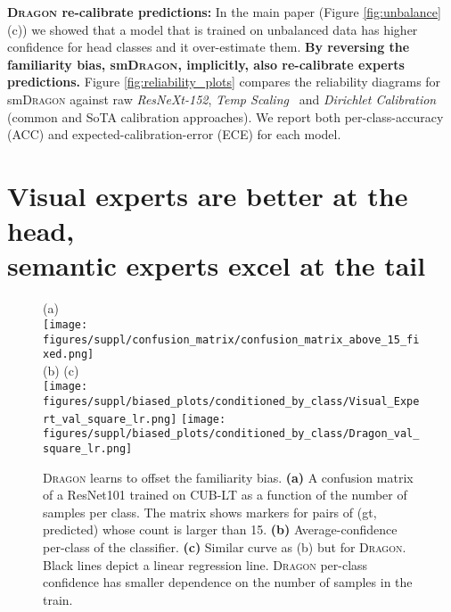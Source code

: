 \documentclass[10pt,twocolumn,letterpaper]{article}
\newcommand{\DRAGON}{\textsc{Dragon}}
\begin{document}
\textbf{\DRAGON{} re-calibrate predictions:}
In the main paper (Figure \ref{fig:unbalance}(c)) we showed that a model that is trained on unbalanced data has higher confidence for head classes and it over-estimate them. \textbf{By reversing the familiarity bias, sm\DRAGON{}, implicitly, also re-calibrate experts predictions.} Figure \ref{fig:reliability_plots} compares the reliability diagrams for sm\DRAGON{} against raw \textit{ResNeXt-152}, \textit{Temp Scaling~\cite{Guo2017OnCO}} and  \textit{Dirichlet Calibration~\cite{Kull2019BeyondTS}} (common and SoTA calibration approaches).
We report both per-class-accuracy (ACC) and expected-calibration-error (ECE) for each model.







\section{Visual experts are better at the head, 
\\
semantic experts excel at the tail}
\label{appendix:visual_vs_attribute}

\begin{figure}[t!]
    \centering
    (a) 
    \\
    \texttt{[image: figures/suppl/confusion\_matrix/confusion\_matrix\_above\_15\_fixed.png]} 
    \\
    (b) \hspace{80pt}
    (c)
    \\
    \texttt{[image: figures/suppl/biased\_plots/conditioned\_by\_class/Visual\_Expert\_val\_square\_lr.png]}
    \texttt{[image: figures/suppl/biased\_plots/conditioned\_by\_class/Dragon\_val\_square\_lr.png]}\\

    \caption{\DRAGON{} learns to offset the familiarity bias. 
    \textbf{(a)} A confusion matrix of a ResNet101 trained  
    on CUB-LT as a function of the number of samples per class. The matrix shows markers for pairs of (gt, predicted) whose count is larger than 15.
    \textbf{(b)} Average-confidence per-class of the classifier.  \textbf{(c)} Similar curve as (b) but for \DRAGON{}. 
    Black lines depict a linear regression line. \DRAGON{} per-class confidence has smaller dependence on the number of samples in the train. 
    }
    \label{fig:familiarity-bias-dragon}
\end{figure}
\end{document}
